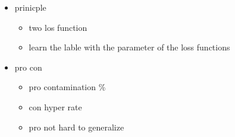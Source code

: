 \documentclass[../description.tex]{subfiles}
\begin{document}
    \begin{itemize}
        \item prinicple
        \begin{itemize}
            \item two los function 
            \item learn the lable with the parameter of the loss functions
        \end{itemize}
        \item pro con 
        \begin{itemize}
            \item pro contamination \%
            \item con hyper rate 
            \item pro not hard to generalize 
        \end{itemize}
    \end{itemize}
\end{document}
